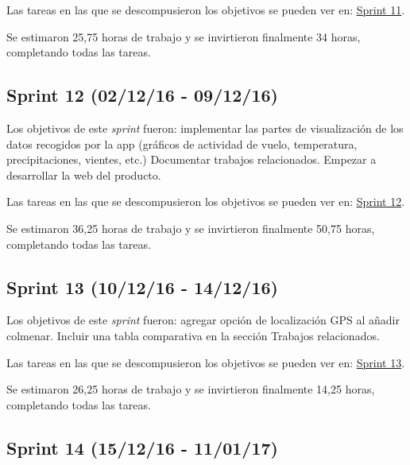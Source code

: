 Las tareas en las que se descompusieron los objetivos se pueden ver en:
\href{https://github.com/davidmigloz/go-bees/milestone/12?closed=1}{Sprint
11}.

Se estimaron 25,75 horas de trabajo y se invirtieron finalmente 34
horas, completando todas las tareas.


\subsection{Sprint 12 (02/12/16 -
09/12/16)}\label{sprint-12-021216---091216}

Los objetivos de este \emph{sprint} fueron: implementar las partes de
visualización de los datos recogidos por la app (gráficos de actividad
de vuelo, temperatura, precipitaciones, vientes, etc.) Documentar
trabajos relacionados. Empezar a desarrollar la web del producto.

Las tareas en las que se descompusieron los objetivos se pueden ver en:
\href{https://github.com/davidmigloz/go-bees/milestone/13?closed=1}{Sprint
12}.

Se estimaron 36,25 horas de trabajo y se invirtieron finalmente 50,75
horas, completando todas las tareas.


\subsection{Sprint 13 (10/12/16 -
14/12/16)}\label{sprint-13-101216---141216}

Los objetivos de este \emph{sprint} fueron: agregar opción de
localización GPS al añadir colmenar. Incluir una tabla comparativa en la
sección Trabajos relacionados.

Las tareas en las que se descompusieron los objetivos se pueden ver en:
\href{https://github.com/davidmigloz/go-bees/milestone/14?closed=1}{Sprint
13}.

Se estimaron 26,25 horas de trabajo y se invirtieron finalmente 14,25
horas, completando todas las tareas.


\subsection{Sprint 14 (15/12/16 -
11/01/17)}\label{sprint-14-151216---110117}

